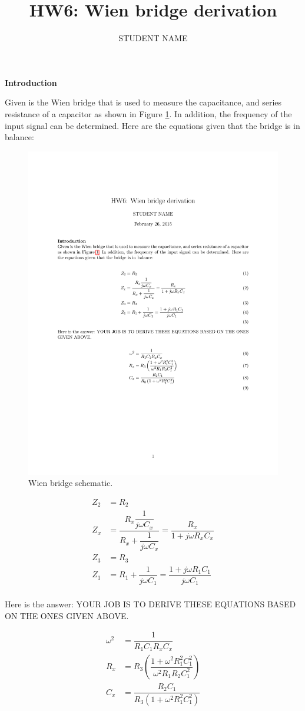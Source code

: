\documentclass[11pt,letterpaper]{article}
\author{STUDENT NAME}
\title{HW6: Wien bridge derivation}
\begin{document}
\maketitle

\textbf{Introduction}

Given is the Wien bridge that is used to measure the capacitance, and series resistance of a capacitor as shown in Figure \ref{fig:HW6_WienBridge}. In addition, the frequency of the input signal can be determined. Here are the equations given that the bridge is in balance:

\begin{figure}
\centering
\includegraphics[width=0.7\linewidth]{HW6_WienBridge}
\caption{Wien bridge schematic.}
\label{fig:HW6_WienBridge}
\end{figure}


\begin{align}\label{HW_WienBridge1}
Z_2 &= R_2\\
Z_x &= \dfrac{R_x \dfrac{1}{j \omega C_x}}{R_x + \dfrac{1}{j \omega C_x}} = \dfrac{R_x}{1+j \omega R_x C_x}\\
Z_3 &= R_3\\
Z_1 &= R_1 + \dfrac{1}{j \omega C_1} = \dfrac{1+j \omega R_1 C_1}{j \omega C_1}\\ 
\end{align}

Here is the answer: YOUR JOB IS TO DERIVE THESE EQUATIONS BASED ON THE ONES GIVEN ABOVE.

\begin{align}\label{HW_WienBridge2}
\omega ^2 &= \dfrac{1}{R_1 C_1 R_x C_x}\\
R_x &= R_3\left( \dfrac{1 + \omega^2 R_1^2 C_1^2}{\omega^2 R_1 R_2  C_1^2} \right)\\
C_x &= \dfrac{R_2 C_1}{R_3\left( 1 + \omega^2 R_1^2 C_1^2 \right)}\\ 
\end{align}
\end{document}
